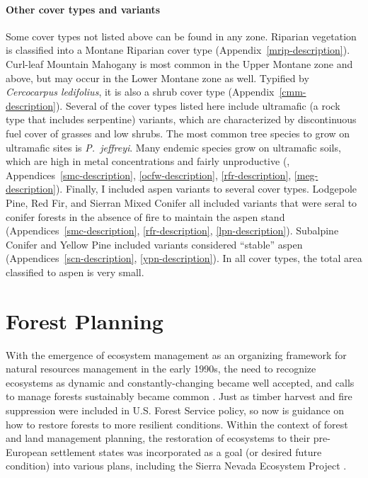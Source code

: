 \paragraph*{Other cover types and variants} Some cover types not listed above can be found in any zone. Riparian vegetation is classified into a Montane Riparian cover type (Appendix~\ref{mrip-description}). 
%
Curl-leaf Mountain Mahogany is most common in the Upper Montane zone and above, but may occur in the Lower Montane zone as well. Typified by \emph{Cercocarpus ledifolius}, it is also a shrub cover type (Appendix~\ref{cmm-description}). 
%
Several of the cover types listed here include ultramafic (a rock type that includes serpentine) variants, which are characterized by discontinuous fuel cover of grasses and low shrubs. The most common tree species to grow on ultramafic sites is \emph{P.~jeffreyi}. Many endemic species grow on ultramafic soils, which are high in metal concentrations and fairly unproductive (\citealt{OGeen2007}, Appendices~\ref{smc-description}, \ref{ocfw-description}, \ref{rfr-description}, \ref{meg-description}).
%
Finally, I included aspen variants to several cover types. Lodgepole Pine, Red Fir, and Sierran Mixed Conifer all included variants that were seral to conifer forests in the absence of fire to maintain the aspen stand (Appendices~\ref{smc-description}, \ref{rfr-description}, \ref{lpn-description}). Subalpine Conifer and Yellow Pine included variants considered ``stable'' aspen (Appendices~\ref{scn-description}, \ref{ypn-description}). In all cover types, the total area classified to aspen is very small. 


\section{Forest Planning}

With the emergence of ecosystem management as an organizing framework for natural resources management in the early 1990s, the need to recognize ecosystems as dynamic and constantly-changing became well accepted, and calls to manage forests sustainably became common \citep{Christensen1996}. Just as timber harvest and fire suppression were included in U.S. Forest Service policy, so now is guidance on how to restore forests to more resilient conditions. Within the context of forest and land management planning, the restoration of ecosystems to their pre-European settlement states was incorporated as a goal (or desired future condition) into various plans, including the Sierra Nevada Ecosystem Project \citep{SNEP1996a}. 

